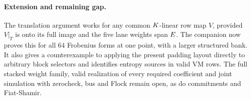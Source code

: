 \paragraph{Extension and remaining gap.} The translation argument works for any common $K$-linear row map $V$, provided $V|_T$ is onto its full image and the five lane weights span $E$. The companion  now proves this for all $64$ Frobenius forms at one point, with a larger structured bank. It also gives a counterexample to applying the present padding layout directly to arbitrary block selectors and identifies entropy sources in valid VM rows. The full stacked weight family, valid realization of every required coefficient and joint simulation with zerocheck, bus and Flock remain open, as do commitments and Fiat-Shamir.
